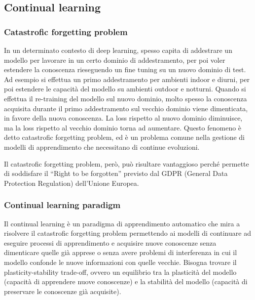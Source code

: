\newpage

\subsection{Continual learning}
\subsubsection*{Catastrofic forgetting problem}
In un determinato contesto di deep learning, spesso capita di addestrare un modello per lavorare in un certo dominio di
addestramento, per poi voler estendere la conoscenza rieseguendo un fine tuning su un nuovo dominio di test. Ad esempio
si effettua un primo addestramento per ambienti indoor e diurni, per poi estendere le capacità del modello su ambienti
outdoor e notturni. Quando si effettua il re-training del modello sul nuovo dominio, molto spesso la conoscenza acquisita
durante il primo addestramento sul vecchio dominio viene dimenticata, in favore della nuova conoscenza. La loss rispetto
al nuovo dominio diminuisce, ma la loss rispetto al vecchio dominio torna ad aumentare. Questo fenomeno è detto catastrofic
forgetting problem, ed è un problema comune nella gestione di modelli di apprendimento che necessitano di continue evoluzioni.

Il catastrofic forgetting problem, però, può risultare vantaggioso perché permette di soddisfare il ``Right to be forgotten''
previsto dal GDPR (General Data Protection Regulation) dell'Unione Europea.

\subsubsection*{Continual learning paradigm}
Il continual learning è un paradigma di apprendimento automatico che mira a risolvere il catastrofic forgetting problem
permettendo ai modelli di continuare ad eseguire processi di apprendimento e acquisire nuove conoscenze senza dimenticare
quelle già apprese o senza avere problemi di interferenza in cui il modello confonde le nuove informazioni con quelle vecchie.
Bisogna trovare il plasticity-stability trade-off, ovvero un equilibrio tra la plasticità del modello (capacità di apprendere
nuove conoscenze) e la stabilità del modello (capacità di preservare le conoscenze già acquisite).

